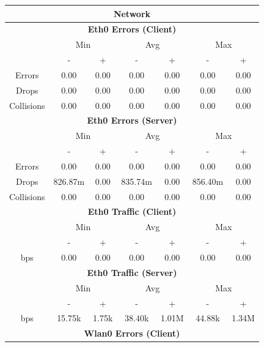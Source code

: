 \documentclass[11pt,a4paper]{scrreprt}
\begin{document}
\begin{table}[H]
\centering
    \begin{tabular}{||c|c|c|c|c|c|c||}
    \hline
    \multicolumn{7}{|c|}{\textbf{Network}} \\
    \hline
    \multicolumn{7}{|c|}{\textbf{Eth0 Errors (Client)}} \\
    \hline\hline
      & \multicolumn{2}{|c|}{Min} & \multicolumn{2}{|c|}{Avg} & \multicolumn{2}{|c|}{Max} \\
    \hline
     & - & + & - & + & - & + \\
    \hline
    Errors & 0.00 & 0.00 & 0.00 & 0.00 & 0.00 & 0.00 \\
    \hline
    Drops & 0.00 & 0.00 & 0.00 & 0.00 & 0.00 & 0.00 \\
    \hline
    Collisions & 0.00 & 0.00 & 0.00 & 0.00 & 0.00 & 0.00 \\
    \hline\hline
    \multicolumn{7}{|c|}{\textbf{Eth0 Errors (Server)}} \\
    \hline\hline
      & \multicolumn{2}{|c|}{Min} & \multicolumn{2}{|c|}{Avg} & \multicolumn{2}{|c|}{Max} \\
    \hline
     & - & + & - & + & - & + \\
    \hline
    Errors & 0.00 & 0.00 & 0.00 & 0.00 & 0.00 & 0.00 \\
    \hline
    Drops & 826.87m & 0.00 & 835.74m & 0.00 & 856.40m & 0.00 \\
    \hline
    Collisions & 0.00 & 0.00 & 0.00 & 0.00 & 0.00 & 0.00 \\
    \hline\hline
    \multicolumn{7}{|c|}{\textbf{Eth0 Traffic (Client)}} \\
    \hline\hline
      & \multicolumn{2}{|c|}{Min} & \multicolumn{2}{|c|}{Avg} & \multicolumn{2}{|c|}{Max} \\
    \hline
      & - & + & - & + & - & + \\
    \hline
    bps & 0.00 & 0.00 & 0.00 & 0.00 & 0.00 & 0.00 \\
    \hline\hline
    \multicolumn{7}{|c|}{\textbf{Eth0 Traffic (Server)}} \\
    \hline\hline
      & \multicolumn{2}{|c|}{Min} & \multicolumn{2}{|c|}{Avg} & \multicolumn{2}{|c|}{Max} \\
    \hline
      & - & + & - & + & - & + \\
    \hline
    bps & 15.75k & 1.75k & 38.40k & 1.01M & 44.88k & 1.34M \\
    \hline\hline
    \multicolumn{7}{|c|}{\textbf{Wlan0 Errors (Client)}} \\

\end{tabular}
\end{table}
\end{document}
